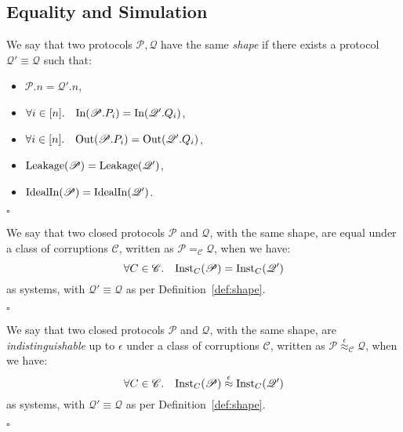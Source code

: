 \subsection{Equality and Simulation}

\begin{definition}[Shape]
  \label{def:shape}
  We say that two protocols $\mathscr{P}, \mathscr{Q}$ have the same \emph{shape}
  if there exists a protocol $\mathscr{Q}' \equiv \mathscr{Q}$ such that:
  \begin{itemize}
    \item $\mathscr{P}.n = \mathscr{Q}'.n$,
    \item $\forall i \in [n].\quad \text{In}(\mathscr{P}.P_i) = \text{In}(\mathscr{Q}'.Q_i)$,
    \item $\forall i \in [n].\quad \text{Out}(\mathscr{P}.P_i) = \text{Out}(\mathscr{Q}'.Q_i)$,
    \item $\text{Leakage}(\mathscr{P}) = \text{Leakage}(\mathscr{Q}')$,
    \item $\text{IdealIn}(\mathscr{P}) = \text{IdealIn}(\mathscr{Q}')$.
  \end{itemize}

  $\square$
\end{definition}

\begin{definition}
  We say that two closed protocols $\mathscr{P}$ and $\mathscr{Q}$,
  with the same shape,
  are equal under a class of corruptions $\mathscr{C}$,
  written as $\mathscr{P} =_{\mathscr{C}} \mathscr{Q}$, when we have:
  $$
  \forall C \in \mathscr{C}.\quad \text{Inst}_C(\mathscr{P}) = \text{Inst}_C(\mathscr{Q'})
  $$
  as systems, with $\mathscr{Q}' \equiv \mathscr{Q}$ as per 
  Definition~\ref{def:shape}.

  $\square$

\end{definition}

\begin{definition}[Indistinguishability]
  We say that two closed protocols $\mathscr{P}$ and $\mathscr{Q}$,
  with the same shape,
  are \emph{indistinguishable} up to $\epsilon$ under a class of corruptions $\mathscr{C}$,
  written as $\mathscr{P} \overset{\epsilon}{\approx}_{\mathscr{C}} \mathscr{Q}$, when we have:
  $$
  \forall C \in \mathscr{C}.\quad \text{Inst}_C(\mathscr{P}) \overset{\epsilon}{\approx} \text{Inst}_C(\mathscr{Q'})
  $$
  as systems, with $\mathscr{Q}' \equiv \mathscr{Q}$ as per 
  Definition~\ref{def:shape}.

  $\square$

\end{definition}

